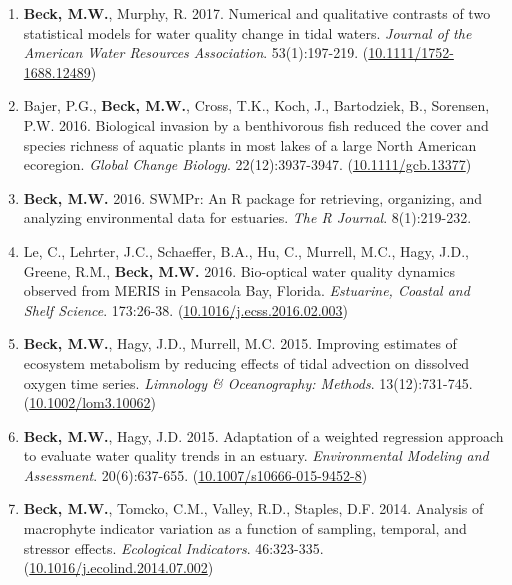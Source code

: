 \documentclass[letterpaper,12pt]{article}
\begin{document}
\begin{enumerate}
\item \textbf{Beck, M.W.}, Murphy, R. 2017. Numerical and qualitative contrasts of two statistical models for water quality change in tidal waters. \textit{Journal of the American Water Resources Association}. 53(1):197-219. ({\footnotesize\href{http://dx.doi.org/10.1111/1752-1688.12489}{10.1111/1752-1688.12489}})

\item Bajer, P.G., \textbf{Beck, M.W.}, Cross, T.K., Koch, J., Bartodziek, B., Sorensen, P.W. 2016. Biological invasion by a benthivorous fish reduced the cover and species richness of aquatic plants in most lakes of a large North American ecoregion. \textit{Global Change Biology}. 22(12):3937-3947. ({\footnotesize\href{http://dx.doi.org/10.1111/gcb.13377}{10.1111/gcb.13377}})

\item \textbf{Beck, M.W.} 2016. SWMPr: An R package for retrieving, organizing, and analyzing environmental data for estuaries. \textit{The R Journal}. 8(1):219-232.

\item Le, C., Lehrter, J.C., Schaeffer, B.A., Hu, C., Murrell, M.C., Hagy, J.D., Greene, R.M., \textbf{Beck, M.W.} 2016. Bio-optical water quality dynamics observed from MERIS in Pensacola Bay, Florida. \textit{Estuarine, Coastal and Shelf Science}. 173:26-38. ({\footnotesize\href{https://doi.org/10.1016/j.ecss.2016.02.003}{10.1016/j.ecss.2016.02.003}})

\item \textbf{Beck, M.W.}, Hagy, J.D., Murrell, M.C. 2015. Improving estimates of ecosystem metabolism by reducing effects of tidal advection on dissolved oxygen time series. \textit{Limnology \& Oceanography: Methods}. 13(12):731-745. ({\footnotesize\href{http://dx.doi.org/10.1002/lom3.10062}{10.1002/lom3.10062}})

\item \textbf{Beck, M.W.}, Hagy, J.D. 2015. Adaptation of a weighted regression approach to evaluate water quality trends in an estuary. \textit{Environmental Modeling and Assessment}. 20(6):637-655. ({\footnotesize\href{http://dx.doi.org/10.1007/s10666-015-9452-8}{10.1007/s10666-015-9452-8}})

\item \textbf{Beck, M.W.}, Tomcko, C.M., Valley, R.D., Staples, D.F. 2014. Analysis of macrophyte indicator variation as a function of sampling, temporal, and stressor effects. \textit{Ecological Indicators}. 46:323-335. ({\footnotesize\href{https://doi.org/10.1016/j.ecolind.2014.07.002}{10.1016/j.ecolind.2014.07.002}})


\end{enumerate}
\end{document}
